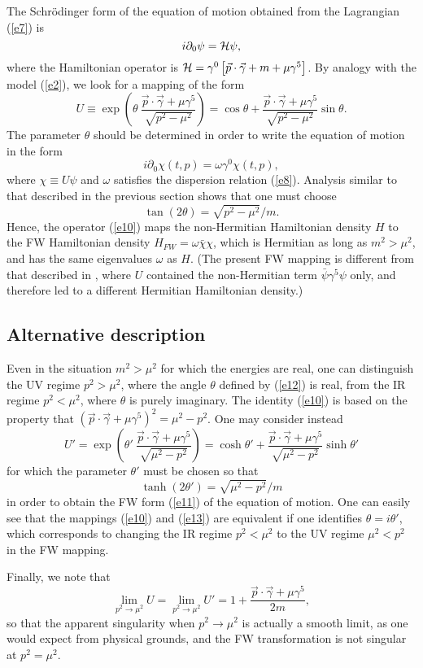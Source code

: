 \documentclass[11pt,prd,aps,amssymb,amsmath,tightenlines,showpacs]{revtex4}
\newcommand{\be}{\begin{equation}}
\newcommand{\ee}{\end{equation}}
\newcommand{\cH}{{\cal H}}
\begin{document}
The Schr\"odinger form of the equation of motion obtained from the Lagrangian
(\ref{e7}) is
\be
i\partial_0\psi=\cH\psi,
\label{e9}
\ee
where the Hamiltonian operator is $\cH=\gamma^0\left[\vec p\cdot\vec\gamma+m+\mu
\gamma^5\right]$. By analogy with the model (\ref{e2}), we look for a mapping of
the form
\be
U\equiv\exp\left(\theta~\frac{\vec p\cdot\vec\gamma+\mu\gamma^5}{\sqrt{p^2-\mu^2
}}\right)=\cos\theta+\frac{\vec p\cdot\vec\gamma+\mu\gamma^5}{\sqrt{p^2-\mu^2}}
\sin\theta.
\label{e10}
\ee
The parameter $\theta$ should be determined in order to write the equation of
motion in the form
\be
i\partial_0\chi(t,p)=\omega\gamma^0\chi(t,p),
\label{e11}
\ee
where $\chi\equiv U\psi$ and $\omega$ satisfies the dispersion relation
(\ref{e8}). Analysis similar to that described in the previous section
shows that one must choose
\be
\tan(2\theta)=\sqrt{p^2-\mu^2}/m.
\label{e12}
\ee
Hence, the operator (\ref{e10}) maps the non-Hermitian Hamiltonian density $H$
to the FW Hamiltonian density $H_{FW}=\omega\bar\chi\chi$, which is Hermitian as
long as $m^2>\mu^2$, and has the same eigenvalues $\omega$ as $H$. (The present
FW mapping is different from that described in \cite{r1}, where $U$ contained
the non-Hermitian term $\bar\psi\gamma^5\psi$ only, and therefore led to a
different Hermitian Hamiltonian density.)

\subsection{Alternative description}
Even in the situation $m^2>\mu^2$ for which the energies are real, one can
distinguish the UV regime $p^2>\mu^2$, where the angle $\theta$ defined by
(\ref{e12}) is real, from the IR regime $p^2<\mu^2$, where $\theta$ is purely
imaginary. The identity (\ref{e10}) is based on the property that $(\vec p\cdot
\vec\gamma+\mu\gamma^5)^2=\mu^2-p^2$. One may consider instead
\be
U'=\exp\left(\theta'~\frac{\vec p\cdot\vec\gamma+\mu\gamma^5}{\sqrt{\mu^2-p^2}}
\right)=\cosh\theta'+\frac{\vec p\cdot\vec\gamma+\mu\gamma^5}{\sqrt{\mu^2-p^2}}
\sinh\theta'
\label{e13}
\ee
for which the parameter $\theta'$ must be chosen so that
$$\tanh(2\theta')=\sqrt{\mu^2-p^2}/m$$
in order to obtain the FW form (\ref{e11}) of the equation of motion. One can
easily see that the mappings (\ref{e10}) and (\ref{e13}) are equivalent if one
identifies $\theta=i\theta'$, which corresponds to changing the IR regime $p^2<
\mu^2$ to the UV regime $\mu^2<p^2$ in the FW mapping.

Finally, we note that
$$\lim_{p^2\to\mu^2}U=\lim_{p^2\to\mu^2}U'=1+\frac{\vec p\cdot\vec\gamma+\mu
\gamma^5}{2m},$$
so that the apparent singularity when $p^2\to\mu^2$ is actually a smooth limit,
as one would expect from physical grounds, and the FW transformation is not
singular at $p^2=\mu^2$.
\end{document}
